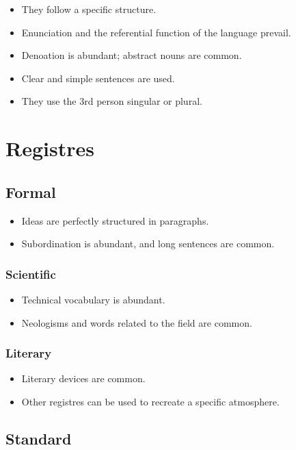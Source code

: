 \documentclass{article}
\begin{document}
\begin{itemize}
    \item They follow a specific structure.
    \item Enunciation and the referential function of the language prevail.
    \item Denoation is abundant; abstract nouns are common.
    \item Clear and simple sentences are used.
    \item They use the 3rd person singular or plural.
\end{itemize}

\section*{Registres}

\subsection*{Formal}

\begin{itemize}
    \item Ideas are perfectly structured in paragraphs.
    \item Subordination is abundant, and long sentences are common.
\end{itemize}

\subsubsection*{Scientific}

\begin{itemize}
    \item Technical vocabulary is abundant.
    \item Neologisms and words related to the field are common.
\end{itemize}

\subsubsection*{Literary}

\begin{itemize}
    \item Literary devices are common.
    \item Other registres can be used to recreate a specific atmosphere.
\end{itemize}

\subsection*{Standard}
\end{document}
